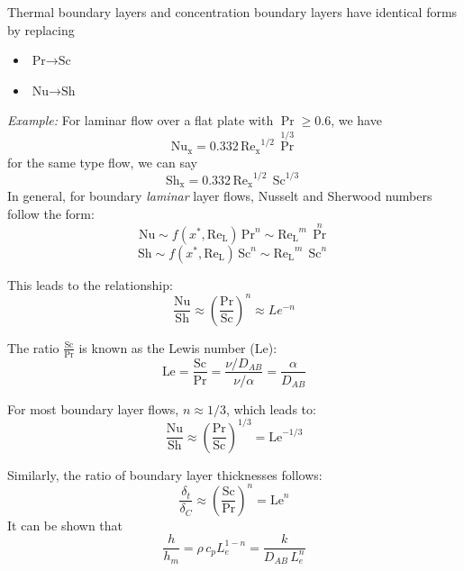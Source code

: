 Thermal boundary layers and concentration boundary layers have identical forms by replacing
\begin{itemize}
    \item $\text{Pr} \rightarrow \text{Sc}$
    \item $\text{Nu} \rightarrow \text{Sh}$
\end{itemize}
%
\textit{Example: } For laminar flow over a flat plate with $\operatorname{Pr} \ge 0.6$, we have
\[
        \operatorname{Nu_x} = 0.332 \, \operatorname{Re_x}^{1/2}\,\operatorname{Pr}^{1/3}
\]
for the same type flow, we can say
\[
        \operatorname{Sh_x} = 0.332 \, \operatorname{Re_x}^{1/2}\,\operatorname{Sc}^{1/3}
\]
In general, for boundary \textit{laminar} layer flows, Nusselt and Sherwood numbers follow the form:
\[
    \text{Nu} \sim f(x^*, \operatorname{Re_L})\,\text{Pr}^n \sim \operatorname{Re_L}^m\, \operatorname{Pr}^n 
\]
\[
\text{Sh} \sim f(x^*, \operatorname{Re_L})\, \text{Sc}^n \sim  \operatorname{Re_L}^m\, \operatorname{Sc}^n 
\]

This leads to the relationship:
\[
\frac{\text{Nu}}{\text{Sh}} \approx \left(\frac{\text{Pr}}{\text{Sc}}\right)^n \approx Le^{-n}
\]

The ratio $\frac{\text{Sc}}{\text{Pr}}$ is known as the Lewis number ($\text{Le}$):
\[
\text{Le} = \frac{\text{Sc}}{\text{Pr}} = \frac{\nu/D_{AB}}{\nu/\alpha} = \frac{\alpha}{D_{AB}} 
\]

For most boundary layer flows, $n \approx 1/3$, which leads to:
\[
    \frac{\text{Nu}}{\text{Sh}} \approx \left(\frac{\text{Pr}}{\text{Sc}}\right)^{1/3} = \text{Le}^{-1/3}
\]

Similarly, the ratio of boundary layer thicknesses follows:
\[
\frac{\delta_t}{\delta_C} \approx \left(\frac{\text{Sc}}{\text{{Pr}}}\right)^n = \text{Le}^{n}
\]
%
It can be shown that
\[
    \frac{h}{h_m}=\rho\, c_p L_e^{1-n}=\frac{k}{D_{AB}\, L_e^n}
\]



